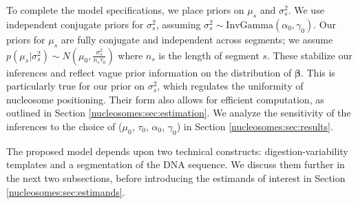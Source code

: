 To complete the model specifications, we place priors on $\mu_{s}$ and $\sigma^2_{s}$.
We use independent conjugate priors for $\sigma^2_{s}$, assuming $\sigma^2_{s} \sim \mathrm{InvGamma}(\alpha_0, \gamma_0)$.
Our priors for $\mu_{s}$ are fully conjugate and independent across segments; we assume $p(\mu_{s} | \sigma^2_{s}) \sim N(\mu_0, \frac{\sigma^2_{s}}{n_{s} \tau_0})$ where $n_{s}$ is the length of segment $s$.
These stabilize our inferences and reflect vague prior information on the distribution of $\bm \beta$.
This is particularly true for our prior on $\sigma^2_{s}$, which regulates the uniformity of nucleosome positioning.
Their form also allows for efficient computation, as outlined in Section \ref{nucleosomes:sec:estimation}.
%
We analyze the sensitivity of the inferences to the choice of ($\mu_0$,  $\tau_0$, $\alpha_0$, $\gamma_0$) in Section \ref{nucleosomes:sec:results}.


%


The proposed model depends upon two technical constructs: digestion-variability templates and a  segmentation of the DNA sequence. We discuss them further in the next two subsections, before introducing the estimands of interest in Section \ref{nucleosomes:sec:estimands}.

